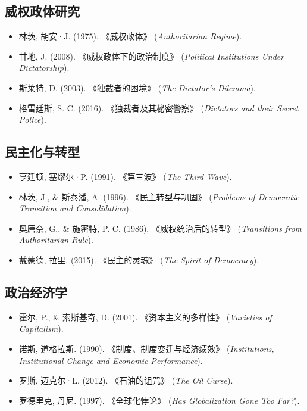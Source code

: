 \documentclass[a5paper, 11pt, openany]{ctexbook}
\begin{document}
\subsection*{威权政体研究}
\begin{itemize}
    \item 林茨, 胡安·J. (1975). 《威权政体》 (\textit{Authoritarian Regime}).
    \item 甘地, J. (2008). 《威权政体下的政治制度》 (\textit{Political Institutions Under Dictatorship}).
    \item 斯莱特, D. (2003). 《独裁者的困境》 (\textit{The Dictator's Dilemma}).
    \item 格雷廷斯, S. C. (2016). 《独裁者及其秘密警察》 (\textit{Dictators and their Secret Police}).
\end{itemize}

\subsection*{民主化与转型}
\begin{itemize}
    \item 亨廷顿, 塞缪尔·P. (1991). 《第三波》 (\textit{The Third Wave}).
    \item 林茨, J., \& 斯泰潘, A. (1996). 《民主转型与巩固》 (\textit{Problems of Democratic Transition and Consolidation}).
    \item 奥唐奈, G., \& 施密特, P. C. (1986). 《威权统治后的转型》 (\textit{Transitions from Authoritarian Rule}).
    \item 戴蒙德, 拉里. (2015). 《民主的灵魂》 (\textit{The Spirit of Democracy}).
\end{itemize}

\subsection*{政治经济学}
\begin{itemize}
    \item 霍尔, P., \& 索斯基奇, D. (2001). 《资本主义的多样性》 (\textit{Varieties of Capitalism}).
    \item 诺斯, 道格拉斯. (1990). 《制度、制度变迁与经济绩效》 (\textit{Institutions, Institutional Change and Economic Performance}).
    \item 罗斯, 迈克尔·L. (2012). 《石油的诅咒》 (\textit{The Oil Curse}).
    \item 罗德里克, 丹尼. (1997). 《全球化悖论》 (\textit{Has Globalization Gone Too Far?}).
\end{itemize}
\end{document}
